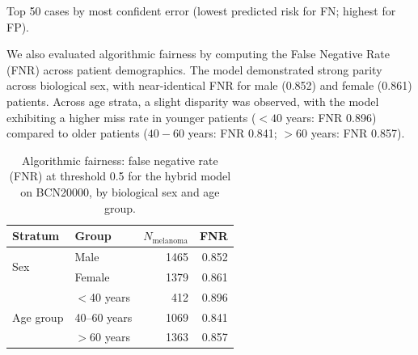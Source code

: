 \documentclass[preprint,12pt]{elsarticle}
\begin{document}
\begin{table}[htbp]
\centering
\caption{ABC descriptor profiles of prediction groups on BCN20000 (hybrid model, threshold = 0.5). False negatives (missed melanomas) show markedly lower asymmetry, reduced border irregularity, and lighter HSV value compared to true positives, consistent with selective failure on feature-poor presentations.}
\label{tab:error_profiling}
\begin{tablenotes}\small
\item[$\dagger$] Top 50 cases by most confident error (lowest predicted risk for FN; highest for FP).
\end{tablenotes}
\end{table}

We also evaluated algorithmic fairness by computing the False Negative Rate (FNR) across patient demographics. The model demonstrated strong parity across biological sex, with near-identical FNR for male (0.852) and female (0.861) patients. Across age strata, a slight disparity was observed, with the model exhibiting a higher miss rate in younger patients ($<40$ years: FNR 0.896) compared to older patients ($40-60$ years: FNR 0.841; $>60$ years: FNR 0.857).

\begin{table}[htbp]
\centering
\caption{Algorithmic fairness: false negative rate (FNR) at threshold 0.5 for the hybrid model on BCN20000, by biological sex and age group.}
\label{tab:fairness}
\begin{tabular}{llrr}
\toprule
Stratum & Group & $N_{\text{melanoma}}$ & FNR \\
\midrule
\multirow{2}{*}{Sex}       & Male   & 1465 & 0.852 \\
                            & Female & 1379 & 0.861 \\
\midrule
\multirow{3}{*}{Age group} & $<$40 years  & 412  & 0.896 \\
                            & 40--60 years & 1069 & 0.841 \\
                            & $>$60 years  & 1363 & 0.857 \\
\bottomrule
\end{tabular}
\end{table}
\end{document}
